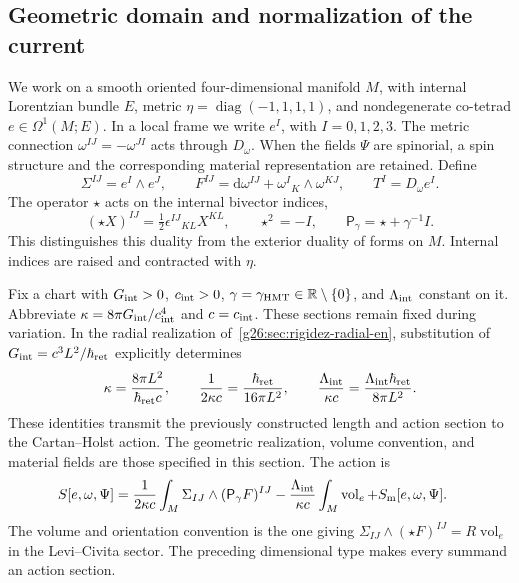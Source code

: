 \subsection{Geometric domain and normalization of the current}
\label{vii:subsec:dominio-corriente-cartan}

We work on a smooth oriented four-dimensional manifold \(M\),
with internal Lorentzian bundle \(E\), metric
\(\eta=\operatorname{diag}(-1,1,1,1)\), and nondegenerate co-tetrad
\(e\in\Omega^1(M;E)\). In a local frame we write
\(e^I\), with \(I=0,1,2,3\). The metric connection
\(\omega^{IJ}=-\omega^{JI}\) acts through \(D_\omega\).
When the fields \(\Psi\) are spinorial, a spin structure and the
corresponding material representation are retained. Define
\begin{equation}
 \Sigma^{IJ}=e^I\wedge e^J,\qquad
 F^{IJ}=\mathrm d\omega^{IJ}+\omega^I{}_{K}\wedge\omega^{KJ},
 \qquad T^I=D_\omega e^I.
 \label{vii:eq:campos-cartan}
\end{equation}
The operator \(\star\) acts on the internal bivector indices,
\begin{equation}
 (\star X)^{IJ}=\tfrac12\epsilon^{IJ}{}_{KL}X^{KL},
 \qquad \star^2=-I,\qquad
 \mathsf P_\gamma=\star+\gamma^{-1}I.
 \label{vii:eq:operador-holst}
\end{equation}
This distinguishes this duality from the exterior duality of forms on
\(M\). Internal indices are raised and contracted with \(\eta\).

Fix a chart with \(G_{\rm int}>0\), \(c_{\rm int}>0\),
\(\gamma=\gamma_{\rm HMT}\in\mathbb R\setminus\{0\}\), and
\(\Lambda_{\rm int}\) constant on it. Abbreviate
\(\kappa=8\pi G_{\rm int}/c_{\rm int}^4\) and \(c=c_{\rm int}\).
These sections remain fixed during variation. In the radial realization
of~\ref{g26:sec:rigidez-radial-en}, substitution of
\(G_{\rm int}=c^3L^2/\hbar_{\rm ret}\) explicitly determines
\[
 \kappa=\frac{8\pi L^2}{\hbar_{\rm ret}c},\qquad
 \frac1{2\kappa c}=\frac{\hbar_{\rm ret}}{16\pi L^2},\qquad
 \frac{\Lambda_{\rm int}}{\kappa c}
   =\frac{\Lambda_{\rm int}\hbar_{\rm ret}}{8\pi L^2}.
\]
These identities transmit the previously constructed length and action
section to the Cartan--Holst action. The geometric realization, volume
convention, and material fields are those specified in this section.
The action is
\begin{equation}
 \begin{split}
 S[e,\omega,\Psi]={}&
 \frac1{2\kappa c}\int_M\Sigma_{IJ}\wedge
                         (\mathsf P_\gamma F)^{IJ}
 -\frac{\Lambda_{\rm int}}{\kappa c}
                         \int_M\operatorname{vol}_e
 +S_{\rm m}[e,\omega,\Psi].
 \end{split}
 \label{vii:eq:accion-cartan-holst}
\end{equation}
The volume and orientation convention is the one giving
\(\Sigma_{IJ}\wedge(\star F)^{IJ}=R\operatorname{vol}_e\)
in the Levi--Civita sector. The preceding dimensional type makes every
summand an action section.

